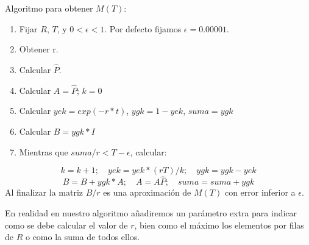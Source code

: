 \documentclass[
]{book}
\providecommand{\tightlist}{%
  \setlength{\itemsep}{0pt}\setlength{\parskip}{0pt}}
\newenvironment{silverbox}{
  \definecolor{shadecolor}{rgb}{192, 192, 192}  
  \color{black}
  \begin{shaded}}
 {\end{shaded}}
\theoremstyle{definition}
\theoremstyle{definition}
\theoremstyle{definition}
\theoremstyle{definition}
\theoremstyle{remark}
\begin{document}
\begin{silverbox}
Algoritmo para obtener \(M(T)\):

\begin{enumerate}
\def\labelenumi{\arabic{enumi}.}
\tightlist
\item
  Fijar \(R\), \(T\), y \(0 < \epsilon < 1\). Por defecto fijamos \(\epsilon = 0.00001\).
\item
  Obtener r.
\item
  Calcular \(\hat{P}\).
\item
  Calcular \(A = \hat{P}\); \(k = 0\)
\item
  Calcular \(yek = exp(-r*t)\), \(ygk = 1 - yek\), \(suma = ygk\)
\item
  Calcular \(B = ygk * I\)
\item
  Mientras que \(suma/r < T-\epsilon\), calcular:
\end{enumerate}

\[k = k + 1; \quad yek = yek*(rT)/k; \quad ygk = ygk - yek\] \[B = B + ygk*A; \quad A = A\hat{P}; \quad suma = suma + ygk\] Al finalizar la matriz \(B/r\) es una aproximación de \(M(T)\) con error inferior a \(\epsilon\).

\end{silverbox}

En realidad en nuestro algoritmo añadiremos un parámetro extra para indicar como se debe calcular el valor de \(r\), bien como el máximo los elementos por filas de \(R\) o como la suma de todos ellos.
\end{document}
